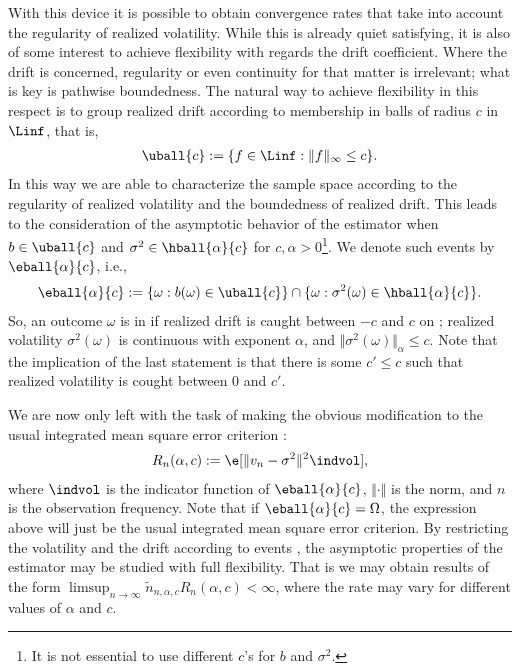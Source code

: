 With this device it is possible to obtain convergence rates that take into account the regularity of realized volatility. While this is already quiet satisfying,  it is also of some interest to achieve  flexibility with regards the drift coefficient. Where the drift is concerned, regularity or even continuity for that matter is irrelevant; what is key is pathwise boundedness. The natural way to achieve flexibility in this respect is to group realized drift according to membership in  balls of radius $c$ in $\Linf$, that is,   
\begin{align} 
  \uball{c} := \{f \in \Linf: \Vert f \Vert_\infty \le c \}.
\end{align}
In this way we are able to  characterize the sample space according to the regularity of realized volatility  and the boundedness of realized drift.  This leads to the consideration of the asymptotic behavior of the estimator when  $b \in \uball{c}$ and $\sigma^2 \in  \hball{\alpha}{c}$ for  $c, \alpha > 0$\footnote{It is not essential to use different $c$'s for $b$ and $\sigma^2$.}. We denote such events by $\eball{\alpha}{c}$, i.e., 
\begin{align}
  \eball{\alpha}{c}  := \{ \omega : b(\omega) \in \uball{c}\} \cap \{\omega: \sigma^2(\omega) \in \hball{\alpha}{c}\}.\notag
  \label{}
\end{align}
So, an outcome $\omega$  is in  if realized drift is caught between $-c$ and $c$ on \domain; realized volatility $\sigma^2(\omega)$  is \holder continuous with exponent $\alpha$,  and $\Vert \sigma^2(\omega) \Vert_\alpha \le c$. Note that the implication of the last statement is that there is some $c' \le c$ such that realized volatility is cought between $0$ and $c'$.     

We are now only left with the task of making the  obvious  modification to the usual  integrated mean square error criterion :
\begin{align}
  R_n(\alpha, c) := \e[\Vert v_n - \sigma^2\Vert^2\indvol],\notag
  \label{}
\end{align} 
where  $\indvol$ is the indicator function of $\eball{\alpha}{c}$, $\Vert \cdot \Vert$ is the \Ltwo norm, and $n$ is the observation frequency. Note that if $\eball{\alpha}{c} = \Omega$,  the expression above will just be the usual integrated mean square error criterion. By restricting the  volatility and the drift according to  events , the asymptotic properties of the estimator may be studied with full flexibility. That is we may  obtain results of the form  $\limsup_{n \to \infty}\tilde{n}_{n,\alpha,c} R_n(\alpha,c) < \infty$, where the rate may vary for different values of $\alpha$ and $c$. 

